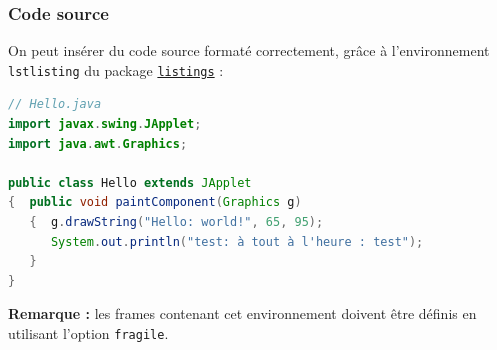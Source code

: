 \documentclass[10pt,    %
    french,             %
    xcolor=table,       %
    envcountsect,       %
    aspectratio=43      %
]{beamer}
\begin{document}
\begin{frame}[fragile]
    \frametitle{Code source}
    \label{frm:sourcecode}
    
    On peut insérer du code source formaté correctement, grâce à l'environnement \texttt{lstlisting} du package \href{https://ctan.org/pkg/listings?lang=en}{\texttt{listings}} :
    
    \begin{lstlisting}[language=Java,caption={Applet Java Hello World.},label={lst:hello}]
// Hello.java
import javax.swing.JApplet;
import java.awt.Graphics;

public class Hello extends JApplet
{  public void paintComponent(Graphics g) 
   {  g.drawString("Hello: world!", 65, 95);
      System.out.println("test: à tout à l'heure : test");
   }    
}
    \end{lstlisting}
    
    \textbf{Remarque :} les frames contenant cet environnement doivent être définis en utilisant l'option \texttt{fragile}.
    
    
\end{frame}
\end{document}
